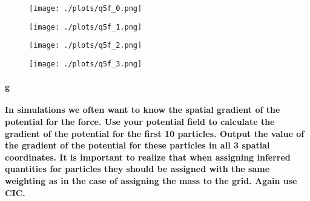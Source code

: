 \begin{figure}[ht]\centering
\begin{minipage}[t]{.5\textwidth}
\centering
\texttt{[image: ./plots/q5f\_0.png]}
\captionsetup{width=0.8\linewidth}
\label{fig:fig50}
\end{minipage}%
\begin{minipage}[t]{.5\textwidth}
\centering
\texttt{[image: ./plots/q5f\_1.png]}
\captionsetup{width=0.8\linewidth}
\label{fig:fig51}
\end{minipage}%
\end{figure}

\begin{figure}[ht]\centering
\begin{minipage}[t]{.5\textwidth}
\centering
\texttt{[image: ./plots/q5f\_2.png]}
\captionsetup{width=0.8\linewidth}
\label{fig:fig52}
\end{minipage}%
\begin{minipage}[t]{.5\textwidth}
\centering
\texttt{[image: ./plots/q5f\_3.png]}
\captionsetup{width=0.8\linewidth}
\label{fig:fig53}
\end{minipage}%
\end{figure}


\paragraph{g} \textbf{In simulations we often want to know the spatial gradient of the potential for the force. Use your potential field to calculate the gradient of the potential for the first 10 particles. Output the value of the gradient of the potential for these particles in all 3 spatial coordinates. It is important to realize that when assigning inferred quantities for particles they should be assigned with the same weighting as in the case of assigning the mass to the grid. Again use CIC.}

